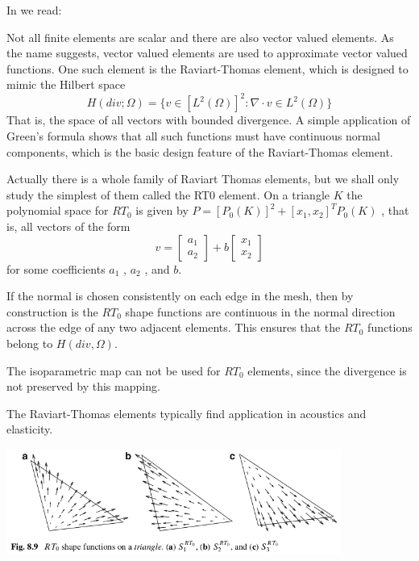 In \textcite{LarsonBengzon} we read: 
\begin{displayquote}
{\color{darkgray}
Not all finite elements are scalar and there are also vector valued elements. As
the name suggests, vector valued elements are used to approximate vector valued
functions. One such element is the Raviart-Thomas element, which is designed to
mimic the Hilbert space
\[
H(div; \Omega) = \{ v\in [L^2(\Omega)]^2 : \nabla \cdot v \in L^2(\Omega) \}
\]
That is, the space of all vectors with bounded divergence. A simple application
of Green’s formula shows that all such functions must have continuous normal
components, which is the basic design feature of the Raviart-Thomas element.



Actually there is a whole family of Raviart Thomas elements, but we shall only
study the simplest of them called the RT0 element. On a triangle $K$ the polynomial
space for $RT_0$ is given by $P=[P_0(K)]^2 + [x_1,x_2]^T P_0(K)$
, that is, all vectors of the form 
\[
v = \left[ \begin{array}{c} a_1 \\ a_2 \end{array} \right]
+ b\left[ \begin{array}{c} x_1 \\ x_2 \end{array} \right]
\]
for some coefficients $a_1$ , $a_2$ , and $b$.

If the normal is chosen consistently on each edge in the mesh, then by
construction is the $RT_0$ shape functions are continuous in the normal direction
across the edge of any two adjacent elements. This ensures that the $RT_0$ functions
belong to $H(div,\Omega)$.

The isoparametric map can not be used for $RT_0$ elements, since the divergence
is not preserved by this mapping.

The Raviart-Thomas elements typically find application in acoustics and
elasticity.

\begin{center}
\includegraphics[width=11cm]{images/pair_raviart-thomas/larsonbengzon}
\end{center}

}
\end{displayquote}

